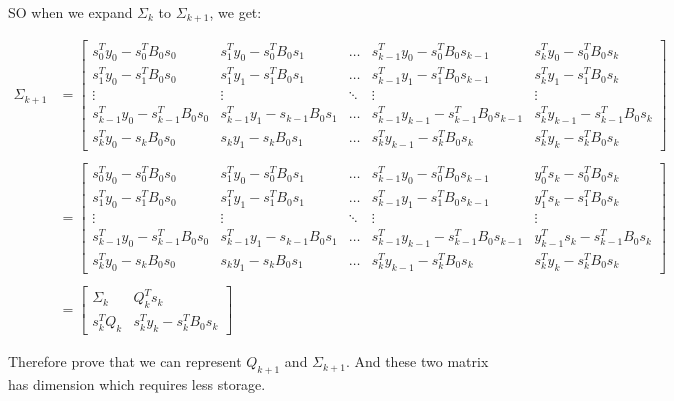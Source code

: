 \documentclass[12pt]{article}
\begin{document}
\begin{enumerate}
SO when we expand $\Sigma_k$ to $\Sigma_{k+1}$, we get:

$\begin{array}{lll}
\Sigma_{k+1} & =
\begin{bmatrix}
s_0^T y_0 - s_0^T B_0 s_0 & s_1^T y_0 - s_0^T B_0 s_1 & \hdots & s_{k-1}^T y_0 - s_0^T B_0 s_{k-1} & s_k^T y_0 - s_0^T B_0 s_k\\
s_1^T y_0 - s_1^T B_0 s_0 & s_1^T y_1 - s_1^T B_0 s_1 & \hdots & s_{k-1}^T y_1 - s_1^T B_0 s_{k-1} & s_k^T y_1 - s_1^T B_0 s_k\\
\vdots & \vdots & \ddots & \vdots & \vdots\\
s_{k-1}^T y_0 - s_{k-1}^T B_0 s_0 & s_{k-1}^T y_1 - s_{k-1} B_0 s_1 & \hdots & s_{k-1}^T y_{k-1} - s_{k-1}^T B_0 s_{k-1} & s_k^T y_{k-1} - s_{k-1}^T B_0 s_k\\
s_k^T y_0 - s_k B_0 s_0 & s_k y_1 - s_k B_0 s_1 & \hdots & s_k^T y_{k-1} - s_k^T B_0 s_k & s_k^Ty_k - s_k^T B_0 s_k
\end{bmatrix}\\
\\
& =
\begin{bmatrix}
s_0^T y_0 - s_0^T B_0 s_0 & s_1^T y_0 - s_0^T B_0 s_1 & \hdots & s_{k-1}^T y_0 - s_0^T B_0 s_{k-1} & y_0^T s_k - s_0^T B_0 s_k\\
s_1^T y_0 - s_1^T B_0 s_0 & s_1^T y_1 - s_1^T B_0 s_1 & \hdots & s_{k-1}^T y_1 - s_1^T B_0 s_{k-1} & y_1^T s_k - s_1^T B_0 s_k\\
\vdots & \vdots & \ddots & \vdots & \vdots\\
s_{k-1}^T y_0 - s_{k-1}^T B_0 s_0 & s_{k-1}^T y_1 - s_{k-1} B_0 s_1 & \hdots & s_{k-1}^T y_{k-1} - s_{k-1}^T B_0 s_{k-1} & y_{k-1}^T s_k - s_{k-1}^T B_0 s_k\\
s_k^T y_0 - s_k B_0 s_0 & s_k y_1 - s_k B_0 s_1 & \hdots & s_k^T y_{k-1} - s_k^T B_0 s_k & s_k^Ty_k - s_k^T B_0 s_k
\end{bmatrix}\\
\\
& =
\begin{bmatrix}
\Sigma_k & Q_k^T s_k \\
s_k^T Q_k & s_k^Ty_k - s_k^T B_0 s_k
\end{bmatrix}
\end{array}$

Therefore prove that we can represent $Q_{k+1}$ and $\Sigma_{k+1}$. And these two matrix has dimension which requires less storage.


\bigskip
\bigskip
\bigskip







\end{enumerate}
\end{document}
